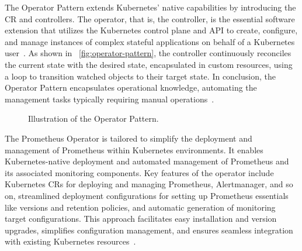 The Operator Pattern extends Kubernetes' native capabilities by introducing the \ac{CR} and controllers. The operator, that is, the controller, is the essential software extension that utilizes the Kubernetes control plane and \ac{API} to create, configure, and manage instances of complex stateful applications on behalf of a Kubernetes user~\parencite{dobiesKubernetesOperators}. As shown in ~\autoref{fig:operator-pattern}, the controller continuously reconciles the current state with the desired state, encapsulated in custom resources, using a loop to transition watched objects to their target state. In conclusion, the Operator Pattern encapsulates operational knowledge, automating the management tasks typically requiring manual operations~\parencite{cncfCNCFOperatorWhite}. 

\begin{figure}[htpb]
    \centering
    \caption[Operator Pattern]{Illustration of the Operator Pattern.}\label{fig:operator-pattern}
\end{figure}

The Prometheus Operator is tailored to simplify the deployment and management of Prometheus within Kubernetes environments. It enables Kubernetes-native deployment and automated management of Prometheus and its associated monitoring components. Key features of the operator include Kubernetes \ac{CR}s for deploying and managing Prometheus, Alertmanager, and so on, streamlined deployment configurations for setting up Prometheus essentials like versions and retention policies, and automatic generation of monitoring target configurations. This approach facilitates easy installation and version upgrades, simplifies configuration management, and ensures seamless integration with existing Kubernetes resources~\parencite{prometheusoperatorIntroduction2020}. 

